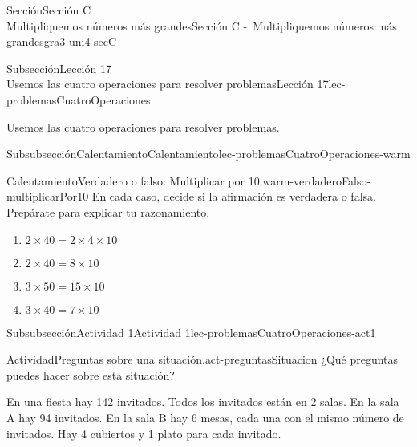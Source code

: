 \begin{sectionptx}{Sección}{{\Large Sección C\\}Multipliquemos números más grandes}{}{Sección C -~Multipliquemos números más grandes}{}{}{gra3-uni4-secC}
%
%
\typeout{************************************************}
\typeout{************************************************}
%
\begin{subsectionptx}{Subsección}{{\normalsize Lección 17\\[-0.05cm]}Usemos las cuatro operaciones para resolver problemas}{}{Lección 17}{}{}{lec-problemasCuatroOperaciones}
\begin{introduction}{}%
Usemos las cuatro operaciones para resolver problemas.%
\end{introduction}%
%
%
\typeout{************************************************}
\typeout{************************************************}
%
\begin{multicols}{2}
\begin{subsubsectionptx}{Subsubsección}{Calentamiento}{}{Calentamiento}{}{}{lec-problemasCuatroOperaciones-warm}
\begin{exploration}{Calentamiento}{Verdadero o falso: Multiplicar por 10.}{warm-verdaderoFalso-multiplicarPor10}%
En cada caso, decide si la afirmación es verdadera o falsa. Prepárate para explicar tu razonamiento.%
%
\begin{enumerate}[label={\Alph*.}]
\item{}\(\displaystyle 2 \times 40 = 2 \times 4 \times 10\)%
\item{}\(\displaystyle 2 \times 40 = 8 \times 10\)%
\item{}\(\displaystyle 3 \times 50 = 15 \times 10\)%
\item{}\(\displaystyle 3 \times 40 = 7 \times 10\)%
\end{enumerate}
\end{exploration}%
\end{subsubsectionptx}
%
%
\typeout{************************************************}
\typeout{************************************************}
%
\begin{subsubsectionptx}{Subsubsección}{Actividad 1}{}{Actividad 1}{}{}{lec-problemasCuatroOperaciones-act1}
\begin{activity}{Actividad}{Preguntas sobre una situación.}{act-preguntasSituacion}%
¿Qué preguntas puedes hacer sobre esta situación?%
\par
En una fiesta hay 142 invitados. Todos los invitados están en 2 salas. En la sala A hay 94 invitados. En la sala B hay 6 mesas, cada una con el mismo número de invitados. Hay 4 cubiertos y 1 plato para cada invitado.%

\end{activity}
\end{subsubsectionptx}
\end{multicols}
\end{subsectionptx}
\end{sectionptx}
